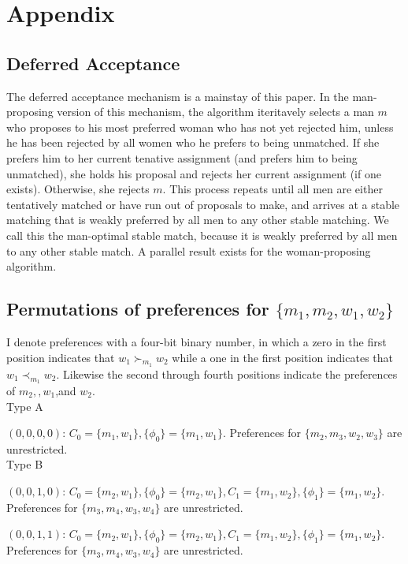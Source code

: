 \documentclass[WP]{AEA}
\begin{document}
\appendix



\section{ Appendix}

\subsection{Deferred Acceptance}
The deferred acceptance mechanism is a mainstay of this paper. In the man-proposing version of this mechanism, the algorithm iteritavely selects a man $m$ who proposes to his most preferred woman who has not yet rejected him, unless he has been rejected by all women who he prefers to being unmatched.  If she prefers him to her current tenative assignment (and prefers him to being unmatched), she holds his proposal and rejects her current assignment (if one exists). Otherwise, she rejects $m$.  This process repeats until all men are either tentatively matched or have run out of proposals to make, and arrives at a stable matching that is weakly preferred by all men to any other stable matching.  We call this the man-optimal stable match, because it is weakly preferred by all men to any other stable match.  A parallel result exists for the woman-proposing algorithm.


\subsection{Permutations of preferences for $\{m_1,m_2,w_1,w_2\}$}
I denote preferences with a four-bit binary number, in which a zero in the first position indicates that $w_1\succ_{m_1} w_2$ while a one in the first position indicates that $w_1\prec_{m_1} w_2$. Likewise the second through fourth positions indicate the preferences of $m_2, ,w_1$,and $w_2$.
\\
Type A

$(0,0,0,0)$: $C_0 =\{m_1,w_1\}, \{\phi_0\}=\{m_1,w_1\}$.  Preferences for $\{m_2,m_3,w_2,w_3\}$ are unrestricted.
\\

Type B

$(0,0,1,0)$: $C_0 =\{m_2,w_1\}, \{\phi_0\}=\{m_2,w_1\}, C_1 =\{m_1,w_2\}, \{\phi_1\}=\{m_1,w_2\}$.  Preferences for $\{m_3,m_4,w_3,w_4\}$ are unrestricted.


$(0,0,1,1)$: $C_0 =\{m_2,w_1\}, \{\phi_0\}=\{m_2,w_1\}, C_1 =\{m_1,w_2\}, \{\phi_1\}=\{m_1,w_2\}$.  Preferences for $\{m_3,m_4,w_3,w_4\}$ are unrestricted.
\end{document}
